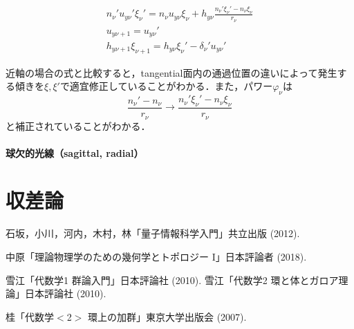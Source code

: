 \documentclass{jsarticle}
\begin{document}
\begin{gather}
    n_\nu'u_{y\nu}'\xi_{\nu}'=n_\nu u_{y\nu}\xi_{\nu}+h_{y\nu}\frac{n_\nu'\xi_\nu'-n_\nu\xi_\nu}{r_\nu}\\
    u_{y\nu+1}=u_{y\nu}'\\
    h_{y\nu+1}\xi_{\nu+1}=h_{y\nu}\xi_{\nu}'-\delta_\nu'u_{y\nu}'
\end{gather}

近軸の場合の式と比較すると，tangential面内の通過位置の違いによって発生する傾きを$\xi,\xi'$で適宜修正していることがわかる．また，パワー$\varphi_\nu$は
\begin{equation}
    \frac{n_\nu'-n_\nu}{r_\nu}
    \longrightarrow
    \frac{n_\nu'\xi_\nu'-n_\nu\xi_\nu}{r_\nu}
\end{equation}
と補正されていることがわかる．

\paragraph{球欠的光線（sagittal, radial）}

\section{収差論}
\label{sec:abberation_theory}


\begin{thebibliography}{99}
石坂，小川，河内，木村，林「量子情報科学入門」共立出版 (2012).

中原「理論物理学のための幾何学とトポロジー I」日本評論者 (2018).

雪江「代数学1 群論入門」日本評論社 (2010).
雪江「代数学2 環と体とガロア理論」日本評論社 (2010).


桂「代数学$<$2$>$ 環上の加群」東京大学出版会 (2007).
\end{thebibliography}
\end{document}
